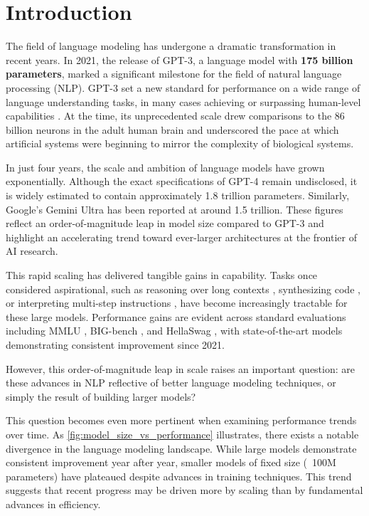 \chapter{Introduction}

The field of language modeling has undergone a dramatic transformation in recent years. In 2021, the release of GPT-3, a language model with \textbf{175 billion parameters}, marked a significant milestone for the field of natural language processing (NLP). GPT-3 set a new standard for performance on a wide range of language understanding tasks, in many cases achieving or surpassing human-level capabilities \citep{brown2020gpt3}. At the time, its unprecedented scale drew comparisons to the 86 billion neurons in the adult human brain \citep{azevedo2009neurons} and underscored the pace at which artificial systems were beginning to mirror the complexity of biological systems.

In just four years, the scale and ambition of language models have grown exponentially. Although the exact specifications of GPT-4 remain undisclosed, it is widely estimated to contain approximately 1.8 trillion parameters. Similarly, Google's Gemini Ultra has been reported at around 1.5 trillion. These figures reflect an order-of-magnitude leap in model size compared to GPT-3 and highlight an accelerating trend toward ever-larger architectures at the frontier of AI research.

This rapid scaling has delivered tangible gains in capability. Tasks once considered aspirational, such as reasoning over long contexts \citep{lewis2020retrieval}, synthesizing code \citep{chen2021evaluating}, or interpreting multi-step instructions \citep{wei2022chain}, have become increasingly tractable for these large models. Performance gains are evident across standard evaluations including MMLU \citep{hendrycks2021mmlu}, BIG-bench \citep{srivastava2023bigbench}, and HellaSwag \citep{zellers2019hellaswag}, with state-of-the-art models demonstrating consistent improvement since 2021.

However, this order-of-magnitude leap in scale raises an important question: are these advances in NLP reflective of better language modeling techniques, or simply the result of building larger models? 

This question becomes even more pertinent when examining performance trends over time. As \cref{fig:model_size_vs_performance} illustrates, there exists a notable divergence in the language modeling landscape. While large models demonstrate consistent improvement year after year, smaller models of fixed size (~100M parameters) have plateaued despite advances in training techniques. This trend suggests that recent progress may be driven more by scaling than by fundamental advances in efficiency.

